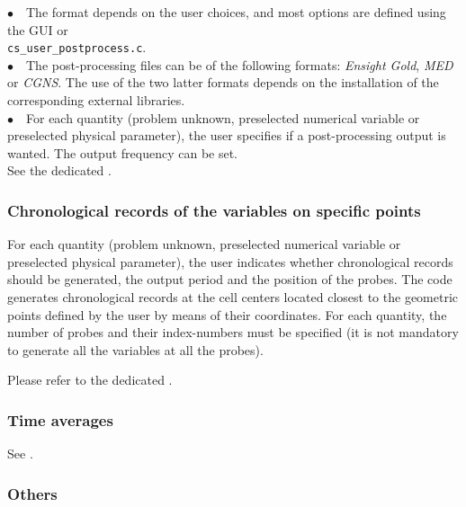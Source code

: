 $\bullet\quad$The format depends on the user choices, and most options
are defined using the GUI or \\
\texttt{cs\_user\_postprocess.c}.\\
$\bullet\quad$The post-processing files can be of the following formats: {\em Ensight Gold},
{\em MED} or {\em CGNS}. The use of the two latter formats depends on
the installation of the corresponding external libraries.\\
$\bullet\quad$For each quantity (problem unknown, preselected numerical
variable or preselected physical parameter), the user specifies if a
post-processing output is wanted. The output frequency can be set.\\

See the dedicated .

\subsubsection{Chronological records of the variables on specific points}

For each quantity (problem unknown, preselected numerical variable or
preselected physical parameter), the user indicates whether chronological records
should be generated, the output period and the position of the
probes. The code generates chronological records at the cell centers located
closest to the geometric points defined by the user by means of their
coordinates. For each quantity, the number of probes and their
index-numbers must be specified (it is not mandatory to generate all
the variables at all the probes).

Please refer to the dedicated .

\subsubsection{Time averages}
See .

\subsubsection{Others}

